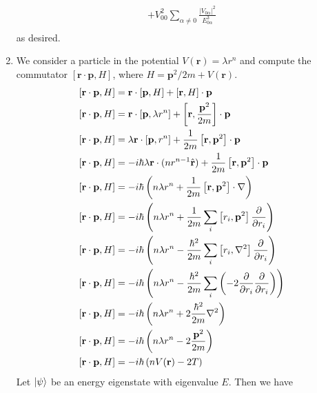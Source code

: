 \documentclass[]{article}
\begin{document}
\begin{enumerate}[1)]
\begin{equation}
\begin{split}
+ V_{00}^2 \sum_{\alpha \ne 0} \frac{  |V_{0\alpha}|^2 }{E_{0\alpha}^3}
\\
\end{split}
\end{equation}
as desired. \\
\item We consider a particle in the potential $V(\textbf{r}) = \lambda r^n$ and compute the commutator $\left[  \textbf{r}\cdot\textbf{p}, H \right]$, where $H = \textbf{p}^2/2m + V(\textbf{r})$. \\

\begin{equation}
\begin{split}
\left[ \textbf{r}\cdot\textbf{p}, H  \right] & = \textbf{r}\cdot\left[ \textbf{p}, H   \right]  + \left[\textbf{r} , H   \right]\cdot\textbf{p}  \\
\left[ \textbf{r}\cdot\textbf{p}, H  \right] & =\textbf{r}\cdot\left[ \textbf{p}, \lambda r^n   \right]  + \left[\textbf{r} , \frac{\textbf{p}^2}{2m}   \right]\cdot\textbf{p}  \\
\left[ \textbf{r}\cdot\textbf{p}, H  \right] & = \lambda \textbf{r}\cdot\left[ \textbf{p}, r^n   \right]  + \frac{1}{2m}\left[\textbf{r} , \textbf{p}^2  \right]\cdot\textbf{p}  \\
\left[ \textbf{r}\cdot\textbf{p}, H  \right] & = -i\hbar \lambda \textbf{r}\cdot ( nr^{n-1}\hat{\textbf{r}} ) + \frac{1}{2m}\left[\textbf{r} , \textbf{p}^2  \right]\cdot \textbf{p} \\ \left[ \textbf{r}\cdot\textbf{p}, H  \right] & = -i\hbar \left( n\lambda r^n + \frac{1}{2m}\left[\textbf{r} , \textbf{p}^2  \right]\cdot \nabla \right) \\
\left[ \textbf{r}\cdot\textbf{p}, H  \right] & = -i\hbar \left( n\lambda r^n  + \frac{1}{2m}\sum_i \left[ r_i, \textbf{p}^2 \right]\pdv{r_i}  \right)\\
\left[ \textbf{r}\cdot\textbf{p}, H  \right] & = -i\hbar \left( n\lambda r^n  - \frac{\hbar^2}{2m}\sum_i \left[ r_i, \nabla^2 \right]\pdv{r_i}  \right) \\
\left[ \textbf{r}\cdot\textbf{p}, H  \right] & = -i\hbar \left( n\lambda r^n  - \frac{\hbar^2}{2m}\sum_i \left( -2 \pdv{r_i} \pdv{r_i}\right)  \right) \\
\left[ \textbf{r}\cdot\textbf{p}, H  \right] & = -i\hbar \left( n\lambda r^n  +2 \frac{\hbar^2}{2m} \nabla^2 \right) \\
\left[ \textbf{r}\cdot\textbf{p}, H  \right] & = -i\hbar \left( n\lambda r^n  -2 \frac{\textbf{p}^2}{2m} \right) \\
\left[ \textbf{r}\cdot\textbf{p}, H  \right] & = -i\hbar \left( nV(\textbf{r})  -2 T \right) \\
\end{split}
\end{equation}
Let $\ket{\psi}$ be an energy eigenstate with eigenvalue $E$. Then we have


\end{enumerate}
\end{document}
